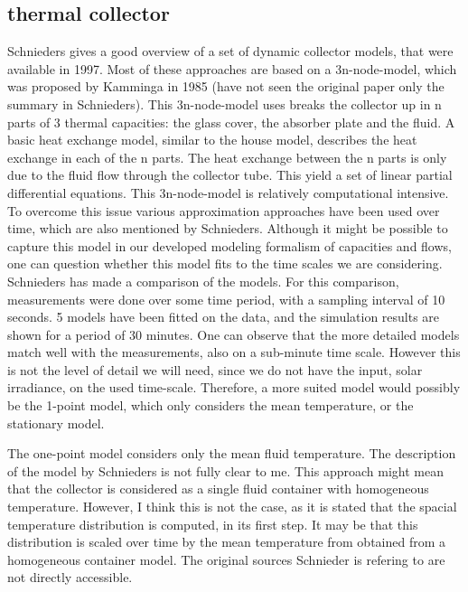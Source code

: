 \subsection{thermal collector}
Schnieders \cite{schnieders1997comparison}  gives a good overview of a set of dynamic collector models, that were available in 1997. Most of these approaches are based on a 3n-node-model, which was proposed by Kamminga in 1985 \cite{kamminga1985experiences}(have not seen the original paper only the summary in Schnieders). This 3n-node-model uses breaks the collector up in n parts of 3 thermal capacities: the glass cover, the absorber plate and the fluid. A basic heat exchange model, similar to the house model, describes the heat exchange in each of the n parts. The heat exchange between the n parts is only due to the fluid flow through the collector tube. This yield a set of linear partial differential equations. This 3n-node-model is relatively computational intensive. To overcome this issue various approximation approaches have been used over time, which are also mentioned by Schnieders. 
Although it might be possible to capture this model in our developed modeling formalism of capacities and flows, one can question whether this model fits to the time scales we are considering. Schnieders has made a comparison of the models. For this comparison, measurements were done over some time period, with a sampling interval of 10 seconds. 5 models have been fitted on the data, and the simulation results are shown for a period of 30 minutes. One can observe that the more detailed models match well with the measurements, also on a sub-minute time scale. However this is not the level of detail we will need, since we do not have the input, solar irradiance, on the used time-scale. Therefore, a more suited model would possibly be the 1-point model, which only considers the mean temperature, or the stationary model.

The one-point model considers only the mean fluid temperature. The description of the model by Schnieders is not fully clear to me. This approach might mean that the collector is considered as a single fluid container with homogeneous temperature. However, I think this is not the case, as it is stated that the spacial temperature distribution is computed, in its first step. It may be that this distribution is scaled over time by the mean temperature from obtained from a homogeneous container model. The original sources Schnieder is refering to are not directly accessible.

